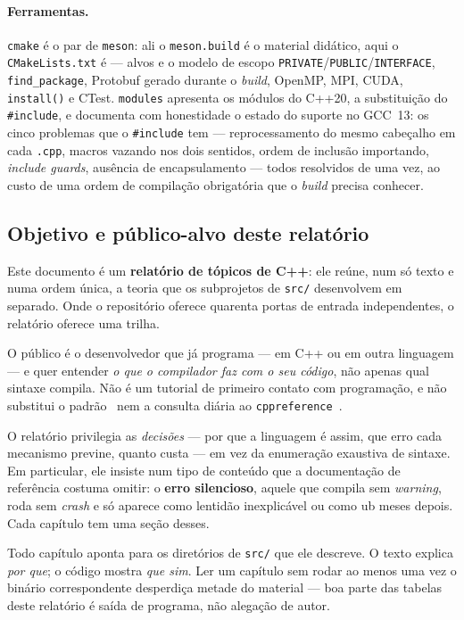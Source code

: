\paragraph{Ferramentas.}
\texttt{cmake} é o par de \texttt{meson}: ali o \texttt{meson.build} é o
material didático, aqui o \texttt{CMakeLists.txt} é --- alvos e o modelo de
escopo \texttt{PRIVATE}/\texttt{PUBLIC}/\texttt{INTERFACE},
\texttt{find\_package}, Protobuf gerado durante o \emph{build}, OpenMP, MPI,
CUDA, \texttt{install()} e CTest. \texttt{modules} apresenta os módulos do
C++20, a substituição do \texttt{\#include}, e documenta com honestidade o
estado do suporte no GCC~13: os cinco problemas que o \texttt{\#include} tem
--- reprocessamento do mesmo cabeçalho em cada \texttt{.cpp}, macros vazando
nos dois sentidos, ordem de inclusão importando, \emph{include guards},
ausência de encapsulamento --- todos resolvidos de uma vez, ao custo de uma
ordem de compilação obrigatória que o \emph{build} precisa conhecer.

\subsection{Objetivo e público-alvo deste relatório}

Este documento é um \textbf{relatório de tópicos de C++}: ele reúne, num só
texto e numa ordem única, a teoria que os subprojetos de \texttt{src/}
desenvolvem em separado. Onde o repositório oferece quarenta portas de entrada
independentes, o relatório oferece uma trilha.

O público é o desenvolvedor que já programa --- em C++ ou em outra linguagem
--- e quer entender \emph{o que o compilador faz com o seu código}, não apenas
qual sintaxe compila. Não é um tutorial de primeiro contato com programação, e
não substitui o padrão~\cite{isocpp20} nem a consulta diária ao
\texttt{cppreference}~\cite{cppreference}.

O relatório privilegia as \emph{decisões} --- por que a linguagem é assim, que
erro cada mecanismo previne, quanto custa --- em vez da enumeração exaustiva de
sintaxe. Em particular, ele insiste num tipo de conteúdo que a documentação de
referência costuma omitir: o \textbf{erro silencioso}, aquele que compila sem
\emph{warning}, roda sem \emph{crash} e só aparece como lentidão inexplicável ou
como \gls{ub} meses depois. Cada capítulo tem uma seção desses.

\begin{regra}
Todo capítulo aponta para os diretórios de \texttt{src/} que ele descreve. O
texto explica \emph{por que}; o código mostra \emph{que sim}. Ler um capítulo
sem rodar ao menos uma vez o binário correspondente desperdiça metade do
material --- boa parte das tabelas deste relatório é saída de programa, não
alegação de autor.
\end{regra}

